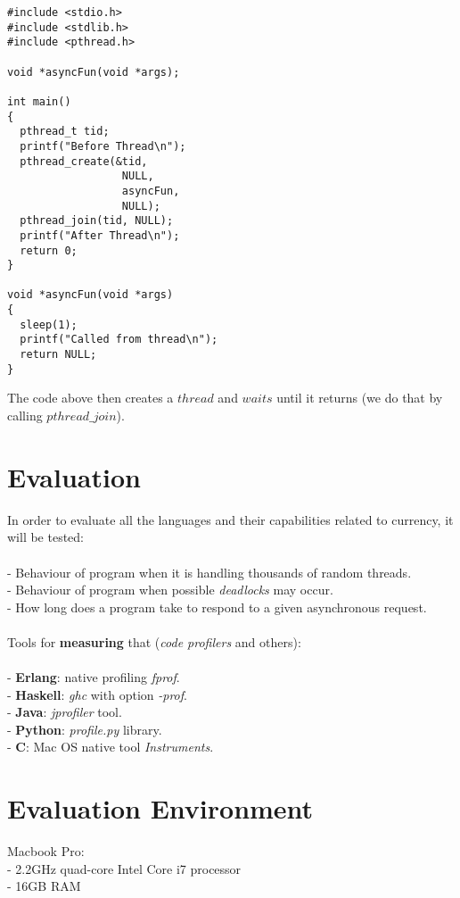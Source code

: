 \documentclass[conference]{IEEEtran}
\begin{document}
\lstset{language=c}
\begin{lstlisting}[frame=single]
#include <stdio.h>
#include <stdlib.h>
#include <pthread.h>
  
void *asyncFun(void *args);

int main()
{
  pthread_t tid;
  printf("Before Thread\n");
  pthread_create(&tid,
                  NULL,
                  asyncFun,
                  NULL);
  pthread_join(tid, NULL);
  printf("After Thread\n");
  return 0;
}

void *asyncFun(void *args)
{
  sleep(1);
  printf("Called from thread\n");
  return NULL;
}
\end{lstlisting}

The code above then creates a $thread$ and $waits$ until it returns (we do that by calling $pthread\_join$).

\section{Evaluation}
In order to evaluate all the languages and their capabilities related to currency, it will be tested:
\\\\
- Behaviour of program when it is handling thousands of random threads.\\
- Behaviour of program when possible \textit{deadlocks} may occur.\\
- How long does a program take to respond to a given asynchronous request.\\
\\
Tools for \textbf{measuring} that (\textit{code profilers} and others):\\
\\
- \textbf{Erlang}: native profiling \textit{fprof}.\\
- \textbf{Haskell}: \textit{ghc} with option \textit{-prof}.\\
- \textbf{Java}: \textit{jprofiler} tool.\\
- \textbf{Python}: \textit{profile.py} library.\\
- \textbf{C}: Mac OS native tool \textit{Instruments}.

\section{Evaluation Environment}
Macbook Pro:\\
- 2.2GHz quad-core Intel Core i7 processor\\
- 16GB RAM
\end{document}
